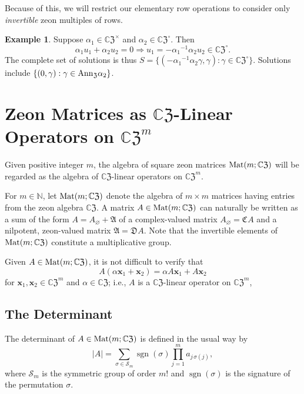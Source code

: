 \documentclass{article}
\theoremstyle{definition}
\newtheorem{example}[theorem]{Example}
\newcommand{\zco}{\mathfrak{C}\mspace{1mu}}
\newcommand{\zdu}{\mathfrak{D}\mspace{1mu}}
\newcommand{\CZ}{\mathbb{C}\mathfrak{Z}}
\newcommand{\Mat}{{\rm Mat}}
\newcommand{\Z}{\mathfrak{Z}}
\newcommand{\Ann}{{\rm Ann}_\Z}
\DeclareMathOperator{\sgn}{sgn}
\numberwithin{equation}{section}
\begin{document}
Because of this, we will restrict our elementary row operations to consider only {\em invertible} zeon multiples of rows.  

\begin{example}
Suppose $\alpha_1\in\CZ^\times$ and $\alpha_2\in\CZ^\circ$.  Then \begin{equation*}
\alpha_1 u_1+\alpha_2u_2=0\Rightarrow u_1=-{\alpha_1}^{-1}\alpha_2 u_2\in\CZ^\circ.
\end{equation*}
The complete set of solutions is thus $S=\{(-{\alpha_1}^{-1}\alpha_2 \gamma,\gamma):\gamma\in\CZ^\circ\}$.
Solutions include $\{(0,\gamma): \gamma\in\Ann\alpha_2\}$.
\end{example}





\section{Zeon Matrices as $\CZ$-Linear Operators on $\CZ^m$}\label{matrices as operators}


Given positive integer $m$, the algebra of square zeon matrices $\Mat(m;\CZ)$ will be regarded as the algebra of $\CZ$-linear operators on $\CZ^m$.

For $m\in \mathbb{N}$, let $\Mat(m;\CZ)$ denote the algebra of $m\times m$ matrices having entries from the zeon algebra $\CZ$.  A matrix $A\in\Mat(m;\CZ)$ can naturally be written as a sum of the form $A=A_\varnothing+\mathfrak{A}$ of a complex-valued matrix $A_\varnothing = \zco A$ and a nilpotent, zeon-valued matrix $\mathfrak{A}=\zdu A$.   
Note that the invertible elements of $\Mat(m; \CZ)$ constitute a multiplicative group.  

Given $A\in\Mat(m;\CZ)$, it is not difficult to verify that  \begin{equation*}
A(\alpha\mathbf{x}_1+\mathbf{x}_2)=\alpha A\mathbf{x}_1+A\mathbf{x}_2
\end{equation*}
 for $\mathbf{x}_1, \mathbf{x}_2\in{\CZ}^m$ and $\alpha\in \CZ$; i.e., $A$ is a $\CZ$-linear operator on ${\CZ}^m$,


\subsection*{The Determinant}

The determinant of $A\in\Mat(m;\CZ)$ is defined in the usual way by \begin{equation*}
|A|=\sum_{\sigma\in \mathcal{S}_m}\sgn(\sigma)\prod_{j=1}^m a_{j\,\sigma(j)},
\end{equation*}
where $\mathcal{S}_m$ is the symmetric group of order $m!$ and $\sgn (\sigma)$ is the signature of the permutation $\sigma$.  
\end{document}
